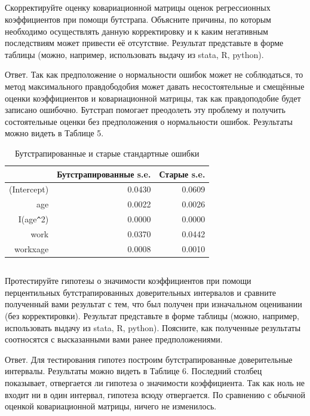 \documentclass[a4paper,12pt]{article}
\begin{document}
\subsection{}

\Sun Скорректируйте оценку ковариационной матрицы оценок регрессионных
коэффициентов при помощи бутстрапа. Объясните причины, по которым необходимо
осуществлять данную корректировку и к каким негативным последствиям может привести
её отсутствие. Результат представьте в форме таблицы (можно, например, использовать
выдачу из stata, R, python).

Ответ. Так как предположение о нормальности ошибок может не соблюдаться, то метод максимального правдободобия может давать несостоятельные и смещённые оценки коэффициентов и ковариационной матрицы, так как правдоподобие будет записано ошибочно. Бутстрап помогает преодолеть эту проблему и получить состоятельные оценки без предположения о нормальности ошибок. Результаты можно видеть в Таблице 5.

\begin{table}[ht]
	\centering
	\begin{tabular}{|rrr|}
		\hline
		& Бутстрапированные s.e. & Старые s.e. \\ 
		  \hline
		(Intercept) & 0.0430 & 0.0609 \\ 
		age & 0.0022 & 0.0026 \\ 
		I(age\verb|^|2) & 0.0000 & 0.0000 \\ 
		work & 0.0370 & 0.0442 \\ 
		workxage & 0.0008 & 0.0010 \\ 
		\hline
	\end{tabular}
\caption{Бутстрапированные и старые стандартные ошибки}
\end{table}

\subsection{}
\Sun Протестируйте гипотезы о значимости коэффициентов при помощи
перцентильных бутстрапированных доверительных интервалов и сравните полученный
вами результат с тем, что был получен при изначальном оценивании (без корректировки).
Результат представьте в форме таблицы (можно, например, использовать выдачу из stata,
R, python). Поясните, как полученные результаты соотносятся с высказанными вами ранее
предположениями.


Ответ. Для тестирования гипотез построим бутстрапированные доверительные интервалы. Результаты можно видеть в Таблице 6. Последний столбец показывает, отвергается ли гипотеза о значимости коэффициента. 	Так как ноль не входит ни в один интервал, гипотеза всюду отвергается. По сравнению с обычной оценкой ковариационной матрицы, ничего не изменилось.
\end{document}
